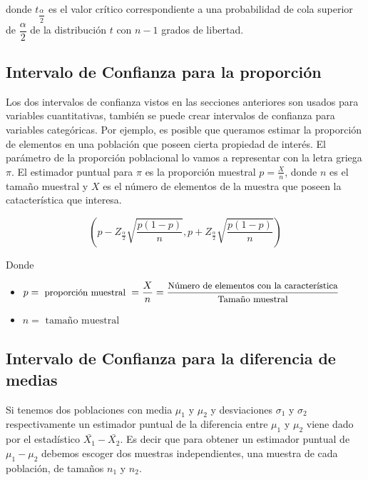 \documentclass[]{book}
\begin{document}
donde \(t_{\dfrac{\alpha}{2}}\) es el valor crítico correspondiente a
una probabilidad de cola superior de \(\dfrac{\alpha}{2}\) de la
distribución \(t\) con \(n-1\) grados de libertad.

\subsection{Intervalo de Confianza para la
proporción}\label{intervalo-de-confianza-para-la-proporcion}

Los dos intervalos de confianza vistos en las secciones anteriores son
usados para variables cuantitativas, también se puede crear intervalos
de confianza para variables categóricas. Por ejemplo, es posible que
queramos estimar la proporción de elementos en una población que poseen
cierta propiedad de interés. El parámetro de la proporción poblacional
lo vamos a representar con la letra griega \(\pi\). El estimador puntual
para \(\pi\) es la proporción muestral \(p=\frac{X}{n}\), donde \(n\) es
el tamaño muestral y \(X\) es el número de elementos de la muestra que
poseen la catacterística que interesa.

\begin{equation} 
  \left(p - Z_{\frac{\alpha}{2}}\sqrt{\dfrac{p\left(1-p\right)}{n}}, p + Z_{\frac{\alpha}{2}}\sqrt{\dfrac{p\left(1-p\right)}{n}}  \right)
  \label{eq:icprop}
\end{equation}

Donde

\begin{itemize}
\item
  \(\small p=\text{ proporción muestral }= \dfrac{X}{n} = \dfrac{\text{Número de elementos con la característica}}{\text{Tamaño muestral}{}}\)
\item
  \(n= \text{ tamaño muestral}\)
\end{itemize}

\subsection{Intervalo de Confianza para la diferencia de
medias}\label{intervalo-de-confianza-para-la-diferencia-de-medias}

Si tenemos dos poblaciones con media \(\mu_1\) y \(\mu_2\) y
desviaciones \(\sigma_1\) y \(\sigma_2\) respectivamente un estimador
puntual de la diferencia entre \(\mu_1\) y \(\mu_2\) viene dado por el
estadístico \(\bar{X_1}-\bar{X_2}\). Es decir que para obtener un
estimador puntual de \(\mu_1-\mu_2\) debemos escoger dos muestras
independientes, una muestra de cada población, de tamaños \(n_1\) y
\(n_2\).
\end{document}

